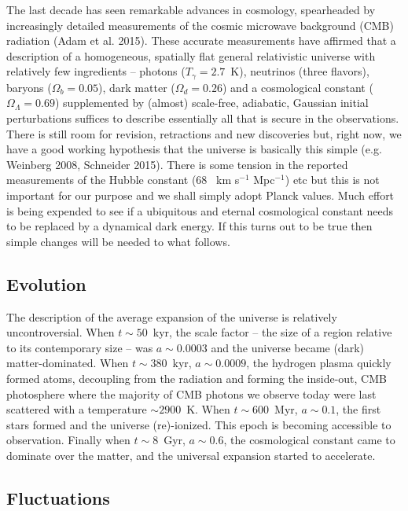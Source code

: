 \documentclass[psfig,11pt]{article}
\begin{document}
The last decade has seen remarkable advances in cosmology, spearheaded by increasingly detailed measurements of the cosmic microwave background (CMB) radiation (Adam et al. 2015). These accurate measurements have affirmed that a description of a homogeneous, spatially flat general relativistic universe with relatively few ingredients -- photons ($T_\gamma=2.7$~K), neutrinos (three flavors), baryons ($\Omega_b=0.05$), dark matter ($\Omega_d=0.26$) and a cosmological constant ($\Omega_\Lambda=0.69$) supplemented by (almost) scale-free, adiabatic, Gaussian initial perturbations suffices to describe essentially all that is secure in the observations. There is still room for revision, retractions and new discoveries but, right now, we have a good working hypothesis that the universe is basically this simple (e.g. Weinberg 2008, Schneider 2015). There is some tension in the reported measurements of the Hubble constant (68 ~km s$^{-1}$ Mpc$^{-1}$) etc but this is not important for our purpose and we shall simply adopt Planck values. Much effort is being expended to see if a ubiquitous and eternal cosmological constant needs to be replaced by a dynamical dark energy. If this turns out to be true then simple changes will be needed to what follows.

\subsection{Evolution}

The description of the average expansion of the universe is relatively uncontroversial. When  $t\sim 50$~kyr,  the scale factor -- the size of a region relative to its contemporary size -- was $a\sim0.0003$ and the universe became (dark) matter-dominated. When $t\sim380$~kyr, $a\sim0.0009$, the hydrogen plasma quickly formed atoms, decoupling from the radiation and forming the inside-out, CMB photosphere where the majority of CMB photons we observe today were last scattered with a temperature $\sim2900$~K. When $t\sim600$~Myr, $a\sim0.1$, the first stars formed and the universe (re)-ionized. This epoch is becoming accessible to observation. Finally when $t\sim8$~Gyr, $a\sim0.6$, the cosmological constant came to dominate over the matter, and the universal expansion started to accelerate.

\subsection{Fluctuations}
\end{document}
